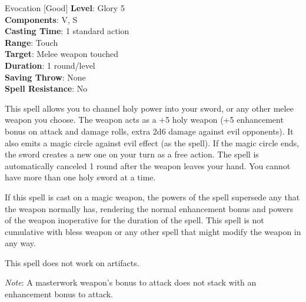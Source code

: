 {Evocation [Good]}
{
	\textbf{Level}: Glory 5\\
	\textbf{Components}: V, S\\
	\textbf{Casting Time}: 1 standard action\\
	\textbf{Range}: Touch\\
	\textbf{Target}: Melee weapon touched\\
	\textbf{Duration}: 1 round/level\\
	\textbf{Saving Throw}: None\\
	\textbf{Spell Resistance}: No\\
}
{
This spell allows you to channel holy power into your sword, or any other melee weapon you choose. The weapon acts as a +5 holy weapon (+5 enhancement bonus on attack and damage rolls, extra 2d6 damage against evil opponents). It also emits a magic circle against evil effect (as the spell). If the magic circle ends, the sword creates a new one on your turn as a free action. The spell is automatically canceled 1 round after the weapon leaves your hand. You cannot have more than one holy sword at a time.

If this spell is cast on a magic weapon, the powers of the spell supersede any that the weapon normally has, rendering the normal enhancement bonus and powers of the weapon inoperative for the duration of the spell. This spell is not cumulative with bless weapon or any other spell that might modify the weapon in any way.

This spell does not work on artifacts.

\textit{Note}: A masterwork weapon’s bonus to attack does not stack with an enhancement bonus to attack.
}